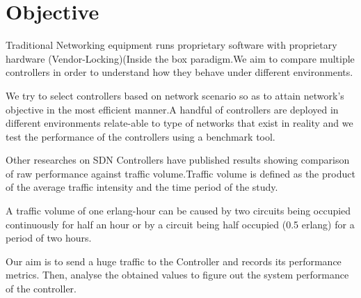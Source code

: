 \chapter*{Objective}
Traditional Networking equipment runs proprietary software with proprietary hardware (Vendor-Locking)(Inside the box paradigm.We aim to {compare multiple controllers} in order to understand how they behave under different environments.

We try to select controllers based on network scenario so as to attain network's objective in the most efficient manner.A handful of controllers are deployed in different environments relate-able to type of networks that exist in reality and we test the performance of the controllers using a benchmark tool.

Other researches on SDN Controllers have published results showing comparison of raw performance against traffic volume.Traffic volume is defined as the product of the average traffic intensity and the time period of the study.

A traffic volume of one erlang-hour can be caused by two circuits being occupied continuously for half an hour or by a circuit being half occupied (0.5 erlang) for a period of two hours.

Our aim is to send a huge traffic to the Controller and records its performance metrics. Then, analyse the obtained values to figure out the system performance of the controller.
